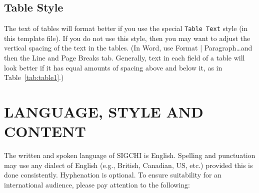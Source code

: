 \documentclass{chi2012}
\begin{document}
\subsection{Table Style}

The text of tables will format better if you use the special
\texttt{Table Text} style (in this template file).  If you do not use
this style, then you may want to adjust the vertical spacing of the
text in the tables. (In Word, use Format | Paragraph\ldots and then
the Line and Page Breaks tab.  Generally, text in each field of a
table will look better if it has equal amounts of spacing above and
below it, as in Table~\ref{tab:table1}.)

\section{LANGUAGE, STYLE AND CONTENT}

The written and spoken language of SIGCHI is English. Spelling and
punctuation may use any dialect of English (e.g., British, Canadian,
US, etc.) provided this is done consistently. Hyphenation is
optional. To ensure suitability for an international audience, please
pay attention to the following: 
\end{document}
